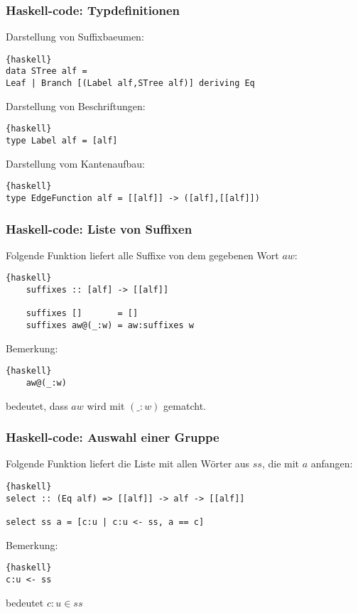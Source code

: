 \documentclass{beamer}
\begin{document}
\begin{frame}[fragile]
\frametitle{Haskell-code: Typdefinitionen}
Darstellung von Suffixbaeumen:
\begin{lstlisting}{haskell}
data STree alf = 
Leaf | Branch [(Label alf,STree alf)] deriving Eq
\end{lstlisting}
\bigskip
Darstellung von Beschriftungen:
\begin{lstlisting}{haskell}
type Label alf = [alf]
\end{lstlisting}
\bigskip
Darstellung vom Kantenaufbau:
\begin{lstlisting}{haskell}
type EdgeFunction alf = [[alf]] -> ([alf],[[alf]])
\end{lstlisting}
\end{frame}

\begin{frame}[fragile]
\frametitle{Haskell-code: Liste von Suffixen}
    Folgende Funktion liefert alle Suffixe von dem gegebenen Wort $aw$:
    \begin{lstlisting}{haskell}
    suffixes :: [alf] -> [[alf]]

    suffixes []       = []              
    suffixes aw@(_:w) = aw:suffixes w 
    \end{lstlisting}
    \bigskip
    Bemerkung: \begin{lstlisting}{haskell}
    aw@(_:w)
    \end{lstlisting} bedeutet, dass $aw$ wird mit $(\_:w)$ gematcht.
\end{frame}


\begin{frame}[fragile]
\frametitle{Haskell-code: Auswahl einer Gruppe}
    Folgende Funktion liefert die Liste mit allen Wörter aus $ss$, die mit $a$ anfangen:
\begin{lstlisting}{haskell}
select :: (Eq alf) => [[alf]] -> alf -> [[alf]]

select ss a = [c:u | c:u <- ss, a == c]
\end{lstlisting}
\bigskip
Bemerkung: \begin{lstlisting}{haskell}
c:u <- ss
\end{lstlisting} bedeutet $c:u \in ss$
\end{frame}
\end{document}
